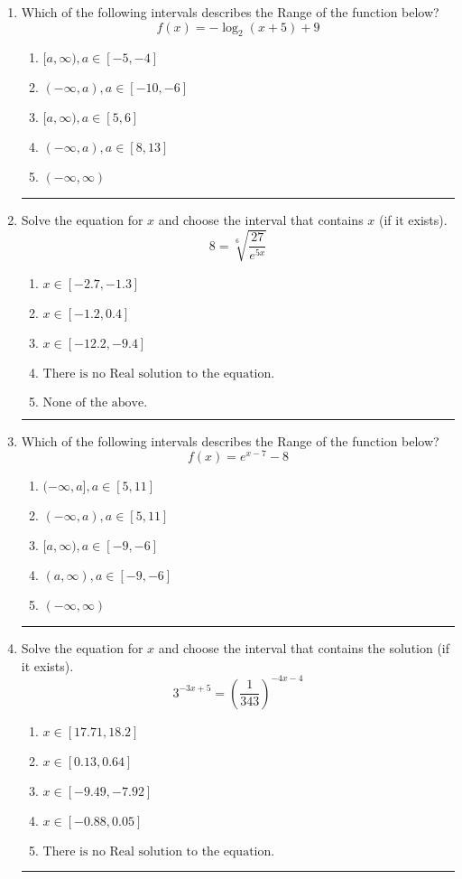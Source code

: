 \documentclass[14pt]{extbook}
\newcommand{\litem}[1]{\item#1\hspace*{-1cm}\rule{\textwidth}{0.4pt}}
\begin{document}
\begin{enumerate}
\litem{
Which of the following intervals describes the Range of the function below?\[ f(x) = -\log_2{(x+5)}+9 \]\begin{enumerate}[label=\Alph*.]
\item \( [a, \infty), a \in [-5, -4] \)
\item \( (-\infty, a), a \in [-10, -6] \)
\item \( [a, \infty), a \in [5, 6] \)
\item \( (-\infty, a), a \in [8, 13] \)
\item \( (-\infty, \infty) \)

\end{enumerate} }
\litem{
 Solve the equation for $x$ and choose the interval that contains $x$ (if it exists).\[  8 = \sqrt[6]{\frac{27}{e^{5x}}} \]\begin{enumerate}[label=\Alph*.]
\item \( x \in [-2.7, -1.3] \)
\item \( x \in [-1.2, 0.4] \)
\item \( x \in [-12.2, -9.4] \)
\item \( \text{There is no Real solution to the equation.} \)
\item \( \text{None of the above.} \)

\end{enumerate} }
\litem{
Which of the following intervals describes the Range of the function below?\[ f(x) = e^{x-7}-8 \]\begin{enumerate}[label=\Alph*.]
\item \( (-\infty, a], a \in [5, 11] \)
\item \( (-\infty, a), a \in [5, 11] \)
\item \( [a, \infty), a \in [-9, -6] \)
\item \( (a, \infty), a \in [-9, -6] \)
\item \( (-\infty, \infty) \)

\end{enumerate} }
\litem{
Solve the equation for $x$ and choose the interval that contains the solution (if it exists).\[ 3^{-3x+5} = \left(\frac{1}{343}\right)^{-4x-4} \]\begin{enumerate}[label=\Alph*.]
\item \( x \in [17.71, 18.2] \)
\item \( x \in [0.13, 0.64] \)
\item \( x \in [-9.49, -7.92] \)
\item \( x \in [-0.88, 0.05] \)
\item \( \text{There is no Real solution to the equation.} \)


\end{enumerate}}
\end{enumerate}
\end{document}
